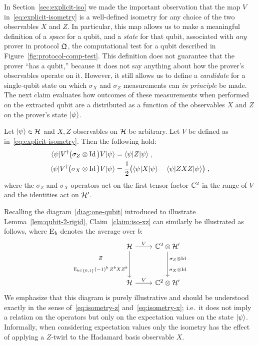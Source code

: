 In Section~\ref{sec:explicit-iso} we made the important observation that the map $V$ in~\eqref{eq:explicit-isometry} is a well-defined isometry for any choice of the two observables $X$ and $Z$. In particular, this map allows us to make a meaningful definition of a \emph{space} for a qubit, and a \emph{state} for that qubit, associated with \emph{any} prover in protocol $\mathfrak{Q}$, the computational test for a qubit described in Figure~\ref{fig:protocol-comp-test}. This definition does not guarantee that the prover ``has a qubit,'' because it does not say anything about how the prover's observables operate on it. 
 However, it still allows us to define a \emph{candidate} for a single-qubit state on which $\sigma_X$ and $\sigma_Z$ measurements can \emph{in principle} be made. The next claim evaluates how outcomes of these measurements when performed on the extracted qubit are a distributed as a function of the observables $X$ and $Z$ on the prover's state $|\psi\rangle$. 

\begin{claim}\label{claim:iso-xz}
Let $|\psi\rangle \in \mathcal{H}$ and $X,Z$ observables on $\mathcal{H}$ be arbitrary. Let $V$ be defined as in~\eqref{eq:explicit-isometry}. Then the following hold:
\begin{align}
\langle\psi| V^\dagger \big(\sigma_Z \otimes \mathop{\rm Id}\nolimits\big) V |\psi\rangle &= \langle\psi| Z |\psi\rangle\;,\label{eq:isometry-z}\\
\langle\psi| V^\dagger \big(\sigma_X \otimes \mathop{\rm Id}\nolimits\big) V |\psi\rangle &= \frac{1}{2} \big(  \langle\psi| X |\psi\rangle -  \langle\psi| ZXZ |\psi\rangle \big)\;,\label{eq:isometry-x}
\end{align}
where the $\sigma_Z$ and $\sigma_X$ operators act on the first tensor factor $\mathbb{C}^2$ in the range of $V$ and the identities act on $\mathcal{H}'$. 
\end{claim}


Recalling the diagram~\ref{diag:one-qubit} introduced to illustrate Lemma~\ref{lem:qubit-2-rigid}, Claim~\ref{claim:iso-xz} can similarly be illustrated as follows, where $\textsc{E}_{b}$ denotes the average over $b$:
\begin{equation}\label{diag:one-qubit-b}
\begin{tikzcd}
\mH  \arrow{r}{V}  \arrow[swap]{dd}{\substack{Z \\[3mm] \Es{b\in\{0,1\}} (-1)^b\, Z^bXZ^b }} &  \C^2 \otimes \mH' \arrow{dd}{\substack{\sigma_Z\otimes \Id\\[3mm] \sigma_X\otimes \Id}} \\
&\\ 
\mH  \arrow{r}{V} & \C^2 \otimes \mH'
\end{tikzcd}
\end{equation}
We emphasize that this diagram is purely illustrative and should be understood exactly in the sense of~\eqref{eq:isometry-z} and~\eqref{eq:isometry-x}; i.e.\ it does not imply a relation on the operators but only on the expectation values on the state $|\psi\rangle$. Informally, when considering expectation values only the isometry has the effect of applying a $Z$-twirl to the Hadamard basis observable $X$. 

